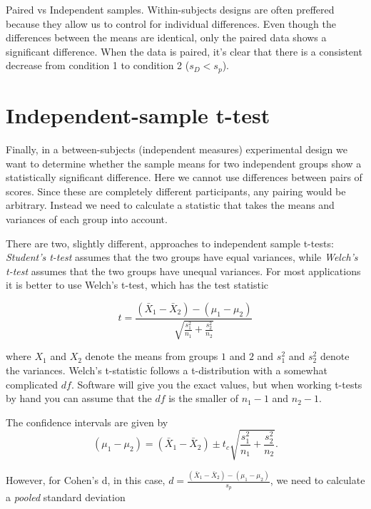 \documentclass{tufte-handout}
\begin{document}
\begin{marginfigure}
  \label{fig:fullfig}%
  \caption{Paired vs Independent samples. Within-subjects designs are often preffered because they allow us to control for individual differences. Even though the differences between the means are identical, only the paired data shows a significant difference. When the data is paired, it's clear that there is a consistent decrease from condition 1 to condition 2 ($s_D<s_p$).}
\end{marginfigure}

\section{Independent-sample t-test}

Finally, in a between-subjects (independent measures) experimental design we want to determine whether the sample means for two independent groups show a statistically significant difference. Here we cannot use differences between pairs of scores. Since these are completely different participants, any pairing would be arbitrary. Instead we need to calculate a statistic that takes the means and variances of each group into account.

There are two, slightly different, approaches to independent sample t-tests: \emph{Student's t-test} assumes that the two groups have equal variances, while \emph{Welch's t-test} assumes that the two groups have unequal variances. For most applications it is better to use Welch's t-test, which has the test statistic

\begin{equation*}
t=\frac{(\bar{X}_1-\bar{X}_2)-(\mu_1-\mu_2)}{\sqrt{\frac{s_1^2}{n_1}+\frac{s_2^2}{n_2}}}
\end{equation*}

where $X_1$ and $X_2$ denote the means from groups $1$ and $2$ and $s_1^2$ and $s_2^2$ denote the variances. Welch's t-statistic follows a t-distribution with a somewhat complicated $df$. Software will give you the exact values, but when working t-tests by hand you can assume that the $df$ is the smaller of $n_1-1$ and $n_2-1$.

The confidence intervals are given by
\begin{equation*}
(\mu_1-\mu_2)=(\bar{X}_1-\bar{X}_2) \pm t_c \sqrt{\frac{s_1^2}{n_1}+\frac{s_2^2}{n_2}}.
\end{equation*}

However, for Cohen's d, in this case, $d=\frac{(\bar{X}_1-\bar{X}_2)-(\mu_1-\mu_2)}{s_p}$, we need to calculate a \emph{pooled} standard deviation
\end{document}
